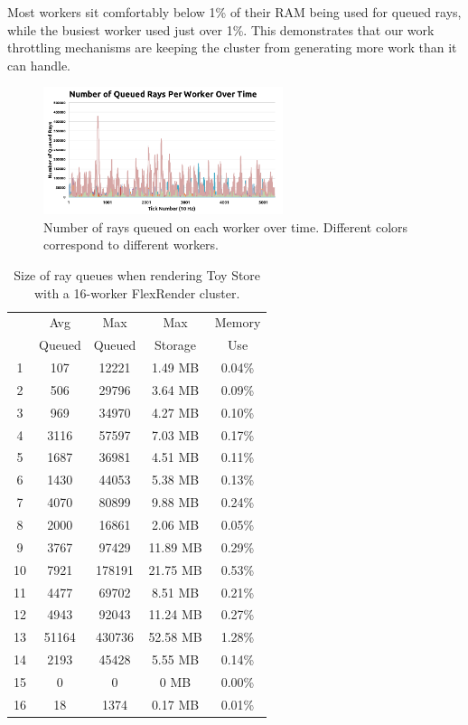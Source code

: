 \documentclass[a4paper,twoside]{article}
\begin{document}
Most workers sit comfortably below 1\% of their RAM being used for queued rays,
while the busiest worker used just over 1\%. This demonstrates that our work
throttling mechanisms are keeping the cluster from generating more work than it
can handle.

\begin{figure}[h!]
    \centering
    \includegraphics[width=70mm]{figures/queuesize.png}
    \caption{Number of rays queued on each worker over time. Different colors correspond to different workers.}
    \label{fig:queuesize}
\end{figure}

\begin{table}
\begin{center}
\begin{tabular}{|c||c|c|c|c|}
    \hline
    & Avg  & Max & Max & Memory \\
    & Queued & Queued & Storage & Use \\
    \hline
    \hline
    1 & 107 & 12221 & 1.49 MB & 0.04\% \\
    \hline
    2 & 506 & 29796 & 3.64 MB & 0.09\% \\
    \hline
    3 & 969 & 34970 & 4.27 MB & 0.10\% \\
    \hline
    4 & 3116 & 57597 & 7.03 MB & 0.17\% \\
    \hline
    5 & 1687 & 36981 & 4.51 MB & 0.11\% \\
    \hline
    6 & 1430 & 44053 & 5.38 MB & 0.13\% \\
    \hline
    7 & 4070 & 80899 & 9.88 MB & 0.24\% \\
    \hline
    8 & 2000 & 16861 & 2.06 MB & 0.05\% \\
    \hline
    9 & 3767 & 97429 & 11.89 MB & 0.29\% \\
    \hline
    10 & 7921 & 178191 & 21.75 MB & 0.53\% \\
    \hline
    11 & 4477 & 69702 & 8.51 MB & 0.21\% \\
    \hline
    12 & 4943 & 92043 & 11.24 MB & 0.27\% \\
    \hline
    13 & 51164 & 430736 & 52.58 MB & 1.28\% \\
    \hline
    14 & 2193 & 45428 & 5.55 MB & 0.14\% \\
    \hline
    15 & 0 & 0 & 0 MB & 0.00\% \\
    \hline
    16 & 18 & 1374 & 0.17 MB & 0.01\% \\
    \hline
\end{tabular}
\caption{Size of ray queues when rendering Toy Store with a 16-worker FlexRender cluster.}
\label{tb:rayqueues}
\end{center}
\end{table}
\end{document}
